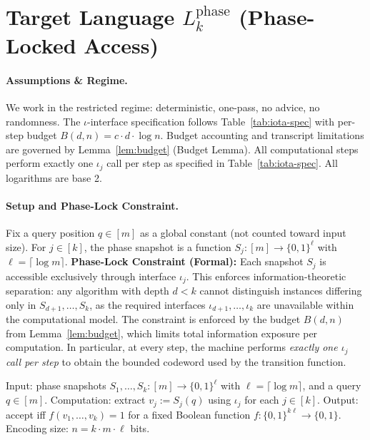 \section{Target Language \texorpdfstring{$L_k^{\text{phase}}$}{Lkphase} (Phase-Locked Access)}
\label{Lkphase:sec}

\paragraph{Assumptions \& Regime.}
We work in the restricted regime: deterministic, one-pass, no advice, no randomness. The $\iota$-interface specification follows Table~\ref{tab:iota-spec} with per-step budget $B(d,n) = c \cdot d \cdot \log n$. Budget accounting and transcript limitations are governed by Lemma~\ref{lem:budget} (Budget Lemma). All computational steps perform exactly one $\iota_j$ call per step as specified in Table~\ref{tab:iota-spec}. All logarithms are base 2.

\paragraph{Setup and Phase-Lock Constraint.}
Fix a query position $q\in[m]$ as a global constant (not counted toward input size). For $j\in[k]$, the phase snapshot is a function $S_j:[m]\to\{0,1\}^{\ell}$ with $\ell=\lceil\log m\rceil$. \textbf{Phase-Lock Constraint (Formal):} Each snapshot $S_j$ is accessible exclusively through interface $\iota_j$. This enforces information-theoretic separation: any algorithm with depth $d<k$ cannot distinguish instances differing only in $S_{d+1},\ldots,S_k$, as the required interfaces $\iota_{d+1},\ldots,\iota_k$ are unavailable within the computational model. The constraint is enforced by the budget $B(d,n)$ from Lemma~\ref{lem:budget}, which limits total information exposure per computation. In particular, at every step, the machine performs \emph{exactly one $\iota_j$ call per step} to obtain the bounded codeword used by the transition function.

\begin{definition}
\label{Lkphase:def:language}
Input: phase snapshots $S_1,\ldots,S_k:[m]\to\{0,1\}^{\ell}$ with $\ell=\lceil\log m\rceil$, and a query $q\in[m]$. Computation: extract $v_j:=S_j(q)$ using $\iota_j$ for each $j\in[k]$. Output: accept iff $f(v_1,\ldots,v_k)=1$ for a fixed Boolean function $f:\{0,1\}^{k\ell}\to\{0,1\}$. Encoding size: $n=k\cdot m\cdot \ell$ bits.
\end{definition}

